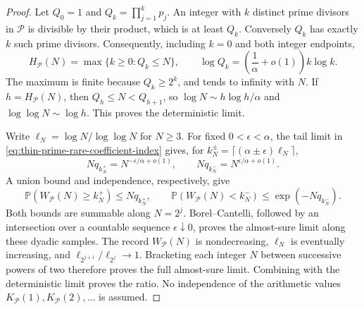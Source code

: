 \documentclass[11pt]{article}
\theoremstyle{definition}
\begin{document}
\begin{proof}
Let $Q_0=1$ and $Q_k=\prod_{j=1}^kp_j$.
An integer with $k$ distinct prime divisors in $\mathcal P$
is divisible by their product, which is at least $Q_k$.
Conversely $Q_k$ has exactly $k$ such prime divisors.
Consequently, including $k=0$ and both integer endpoints,
\begin{equation}
 H_{\mathcal P}(N)=\max\{k\ge0:Q_k\le N\},\qquad
 \log Q_k=\left(\frac1\alpha+o(1)\right)k\log k .
 \label{eq:thin-prime-primorial-inverse}
\end{equation}
The maximum is finite because $Q_k\ge2^k$, and tends to
infinity with $N$.  If $h=H_{\mathcal P}(N)$, then
$Q_h\le N<Q_{h+1}$, so
$\log N\sim h\log h/\alpha$ and
$\log\log N\sim\log h$.  This proves the deterministic limit.

Write $\ell_N=\log N/\log\log N$ for $N\ge3$.
For fixed $0<\epsilon<\alpha$, the tail limit in
\eqref{eq:thin-prime-rare-coefficient-index} gives, for
$k_N^\pm=\lceil(\alpha\pm\epsilon)\ell_N\rceil$,
\[
 Nq_{k_N^+}=N^{-\epsilon/\alpha+o(1)},\qquad
 Nq_{k_N^-}=N^{\epsilon/\alpha+o(1)}.
\]
A union bound and independence, respectively, give
\[
 \mathbb P(W_{\mathcal P}(N)\ge k_N^+)
       \le Nq_{k_N^+},\qquad
 \mathbb P(W_{\mathcal P}(N)<k_N^-)
       \le \exp(-Nq_{k_N^-}).
\]
Both bounds are summable along $N=2^j$.
Borel--Cantelli, followed by an intersection over a countable
sequence $\epsilon\downarrow0$, proves the almost-sure limit
along these dyadic samples.
The record $W_{\mathcal P}(N)$ is nondecreasing, $\ell_N$
is eventually increasing, and
$\ell_{2^{j+1}}/\ell_{2^j}\to1$.
Bracketing each integer $N$ between successive powers of two
therefore proves the full almost-sure limit.
Combining with the deterministic limit proves the ratio.
No independence of the arithmetic values
$K_{\mathcal P}(1),K_{\mathcal P}(2),\ldots$ is assumed.
\end{proof}
\end{document}
